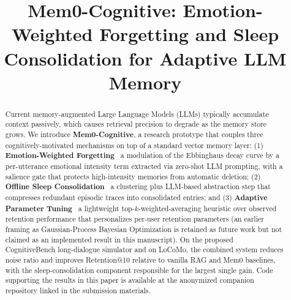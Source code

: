 \documentclass[11pt]{article}
\title{Mem0-Cognitive: Emotion-Weighted Forgetting and Sleep Consolidation for Adaptive LLM Memory}
\begin{document}
\maketitle

\begin{abstract}
Current memory-augmented Large Language Models (LLMs) typically accumulate
context passively, which causes retrieval precision to degrade as the memory
store grows. We introduce \textbf{Mem0-Cognitive}, a research prototype that
couples three cognitively-motivated mechanisms on top of a standard vector
memory layer: (1) \textbf{Emotion-Weighted Forgetting} \textemdash\ a modulation
of the Ebbinghaus decay curve by a per-utterance emotional intensity term
extracted via zero-shot LLM prompting, with a salience gate that protects
high-intensity memories from automatic deletion; (2) \textbf{Offline Sleep
Consolidation} \textemdash\ a clustering plus LLM-based abstraction step that
compresses redundant episodic traces into consolidated entries; and (3)
\textbf{Adaptive Parameter Tuning} \textemdash\ a lightweight
top-$k$-weighted-averaging heuristic over observed retention performance that
personalizes per-user retention parameters (an earlier framing as
Gaussian-Process Bayesian Optimization is retained as future work but not
claimed as an implemented result in this manuscript). On the proposed
CognitiveBench long-dialogue simulator and on LoCoMo, the combined system
reduces noise ratio and improves Retention@10 relative to vanilla RAG and Mem0
baselines, with the sleep-consolidation component responsible for the largest
single gain. Code supporting the results in this paper is available at the
anonymized companion repository linked in the submission materials.
\end{abstract}











\end{document}
